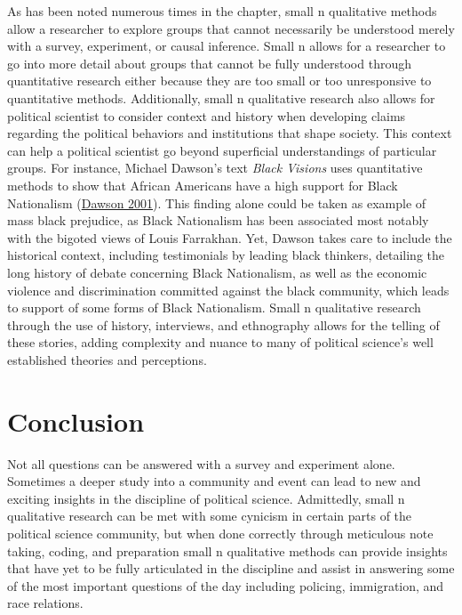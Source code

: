 \documentclass{book}
\begin{document}
As has been noted numerous times in the chapter, small n qualitative methods
allow a researcher to explore groups that cannot necessarily be understood
merely with a survey, experiment, or causal inference. Small n allows for a
researcher to go into more detail about groups that cannot be fully understood
through quantitative research either because they are too small or too
unresponsive to quantitative methods. Additionally, small n qualitative
research also allows for political scientist to consider context and history
when developing claims regarding the political behaviors and institutions that
shape society. This context can help a political scientist go beyond
superficial understandings of particular groups. For instance, Michael
Dawson's text \emph{Black Visions} uses quantitative methods to show that
African Americans have a high support for Black Nationalism
(\protect\hyperlink{ref-dawson2001a}{Dawson 2001}). This finding alone could
be taken as example of mass black prejudice, as Black Nationalism has been
associated most notably with the bigoted views of Louis Farrakhan. Yet, Dawson
takes care to include the historical context, including testimonials by
leading black thinkers, detailing the long history of debate concerning Black
Nationalism, as well as the economic violence and discrimination committed
against the black community, which leads to support of some forms of Black
Nationalism. Small n qualitative research through the use of history,
interviews, and ethnography allows for the telling of these stories, adding
complexity and nuance to many of political science's well established theories
and perceptions.

\hypertarget{conclusion-6}{%
\section{Conclusion}\label{conclusion-6}}

Not all questions can be answered with a survey and experiment alone.
Sometimes a deeper study into a community and event can lead to new and
exciting insights in the discipline of political science. Admittedly, small n
qualitative research can be met with some cynicism in certain parts of the
political science community, but when done correctly through meticulous note
taking, coding, and preparation small n qualitative methods can provide
insights that have yet to be fully articulated in the discipline and assist in
answering some of the most important questions of the day including policing,
immigration, and race relations.
\end{document}
